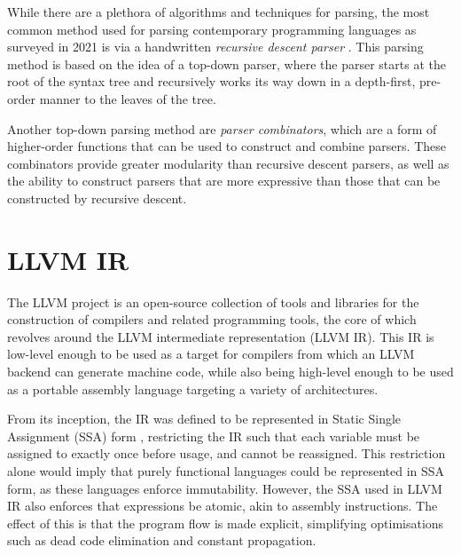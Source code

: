 While there are a plethora of algorithms and techniques for parsing, the most common method used for
parsing contemporary programming languages as surveyed in 2021 is via a handwritten \emph{recursive
    descent parser} \autocite{eaton2021parser}. This parsing method is based on the idea of a top-down
parser, where the parser starts at the root of the syntax tree and recursively works its way down in
a depth-first, pre-order manner to the leaves of the tree.

Another top-down parsing method are \emph{parser combinators}, which are a form of higher-order
functions that can be used to construct and combine parsers. These combinators provide greater
modularity than recursive descent parsers, as well as the ability to construct parsers that are more
expressive than those that can be constructed by recursive descent.


% 

\section{LLVM IR}

The LLVM project is an open-source collection of tools and libraries for the construction of
compilers and related programming tools, the core of which revolves around the LLVM intermediate
representation (LLVM IR). This IR is low-level enough to be used as a target for compilers from
which an LLVM backend can generate machine code, while also being high-level enough to be used as a
portable assembly language targeting a variety of architectures.

From its inception, the IR was defined to be represented in Static Single Assignment (SSA) form
\autocite{lattner2004llvm}, restricting the IR such that each variable must be assigned to exactly
once before usage, and cannot be reassigned. This restriction alone would imply that purely
functional languages could be represented in SSA form, as these languages enforce immutability.
However, the SSA used in LLVM IR also enforces that expressions be atomic, akin to assembly
instructions. The effect of this is that the program flow is made explicit, simplifying
optimisations such as dead code elimination and constant propagation.

